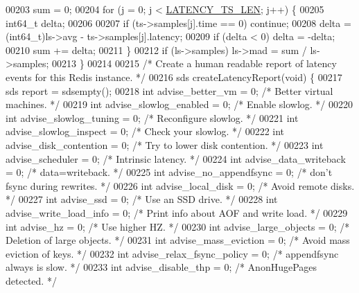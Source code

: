 \begin{DoxyCode}
00203     sum = 0;
00204     \textcolor{keywordflow}{for} (j = 0; j < \hyperlink{latency_8h_a7e3ba352d9d7bb4c88c2c42c16e6674b}{LATENCY\_TS\_LEN}; j++) \{
00205         int64\_t delta;
00206 
00207         \textcolor{keywordflow}{if} (ts->samples[j].time == 0) \textcolor{keywordflow}{continue};
00208         delta = (int64\_t)ls->avg - ts->samples[j].latency;
00209         \textcolor{keywordflow}{if} (delta < 0) delta = -delta;
00210         sum += delta;
00211     \}
00212     \textcolor{keywordflow}{if} (ls->samples) ls->mad = sum / ls->samples;
00213 \}
00214 
00215 \textcolor{comment}{/* Create a human readable report of latency events for this Redis instance. */}
00216 sds createLatencyReport(\textcolor{keywordtype}{void}) \{
00217     sds report = sdsempty();
00218     \textcolor{keywordtype}{int} advise\_better\_vm = 0;       \textcolor{comment}{/* Better virtual machines. */}
00219     \textcolor{keywordtype}{int} advise\_slowlog\_enabled = 0; \textcolor{comment}{/* Enable slowlog. */}
00220     \textcolor{keywordtype}{int} advise\_slowlog\_tuning = 0;  \textcolor{comment}{/* Reconfigure slowlog. */}
00221     \textcolor{keywordtype}{int} advise\_slowlog\_inspect = 0; \textcolor{comment}{/* Check your slowlog. */}
00222     \textcolor{keywordtype}{int} advise\_disk\_contention = 0; \textcolor{comment}{/* Try to lower disk contention. */}
00223     \textcolor{keywordtype}{int} advise\_scheduler = 0;       \textcolor{comment}{/* Intrinsic latency. */}
00224     \textcolor{keywordtype}{int} advise\_data\_writeback = 0;  \textcolor{comment}{/* data=writeback. */}
00225     \textcolor{keywordtype}{int} advise\_no\_appendfsync = 0;  \textcolor{comment}{/* don't fsync during rewrites. */}
00226     \textcolor{keywordtype}{int} advise\_local\_disk = 0;      \textcolor{comment}{/* Avoid remote disks. */}
00227     \textcolor{keywordtype}{int} advise\_ssd = 0;             \textcolor{comment}{/* Use an SSD drive. */}
00228     \textcolor{keywordtype}{int} advise\_write\_load\_info = 0; \textcolor{comment}{/* Print info about AOF and write load. */}
00229     \textcolor{keywordtype}{int} advise\_hz = 0;              \textcolor{comment}{/* Use higher HZ. */}
00230     \textcolor{keywordtype}{int} advise\_large\_objects = 0;   \textcolor{comment}{/* Deletion of large objects. */}
00231     \textcolor{keywordtype}{int} advise\_mass\_eviction = 0;   \textcolor{comment}{/* Avoid mass eviction of keys. */}
00232     \textcolor{keywordtype}{int} advise\_relax\_fsync\_policy = 0; \textcolor{comment}{/* appendfsync always is slow. */}
00233     \textcolor{keywordtype}{int} advise\_disable\_thp = 0;     \textcolor{comment}{/* AnonHugePages detected. */}

\end{DoxyCode}
